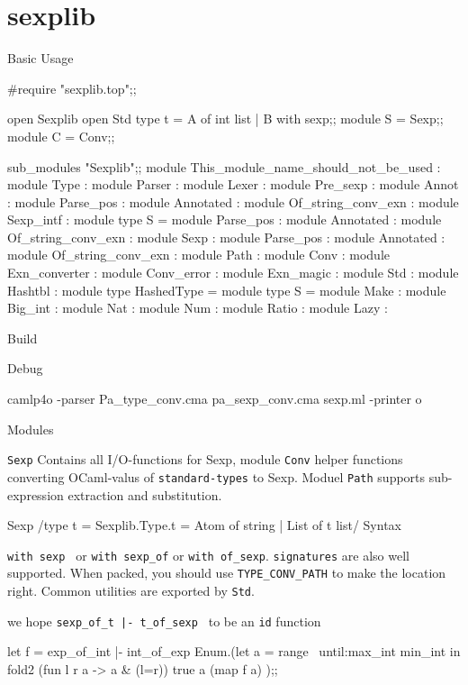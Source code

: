 \section{sexplib}
\label{sec:sexplib}
Basic Usage

\begin{bluetext}
#require "sexplib.top";;
\end{bluetext}
\begin{ocamlcode}
open Sexplib
open Std
type t = A of int list | B with sexp;;
module S = Sexp;;
module C = Conv;;
\end{ocamlcode}

\begin{ocamlcode}
 sub_modules "Sexplib";;
module This_module_name_should_not_be_used :
    module Type :
    module Parser :
    module Lexer :
    module Pre_sexp :
        module Annot :
        module Parse_pos :
        module Annotated :
        module Of_string_conv_exn :
    module Sexp_intf :
        module type S =
            module Parse_pos :
            module Annotated :
            module Of_string_conv_exn :
    module Sexp :
        module Parse_pos :
        module Annotated :
        module Of_string_conv_exn :
    module Path :
    module Conv :
        module Exn_converter :
    module Conv_error :
    module Exn_magic :
    module Std :
        module Hashtbl :
            module type HashedType =
            module type S =
            module Make :
        module Big_int :
        module Nat :
        module Num :
        module Ratio :
        module Lazy :
\end{ocamlcode}

Build

Debug 
\begin{bluetext}
camlp4o -parser Pa_type_conv.cma pa_sexp_conv.cma   sexp.ml -printer o
\end{bluetext}


Modules

\verb|Sexp| Contains all I/O-functions for Sexp, module \verb|Conv|
helper functions converting OCaml-valus of \verb|standard-types| to
Sexp. Moduel \verb|Path| supports sub-expression extraction and
substitution.

Sexp 
/type t = Sexplib.Type.t = Atom of string | List of t list/
Syntax

\verb|with sexp | or \verb|with sexp_of| or \verb|with of_sexp|. 
\verb|signatures| are also  well supported. When packed, you should
use \verb|TYPE_CONV_PATH| to make the location right. Common utilities
are exported by \verb|Std|.

we hope \verb/sexp_of_t |- t_of_sexp / to be an \verb|id| function
\begin{ocamlcode}
let f = exp_of_int |- int_of_exp 
Enum.(let a = range ~until:max_int min_int in 
        fold2 (fun l r a -> a & (l=r)) true a (map f a) );;  
\end{ocamlcode}

